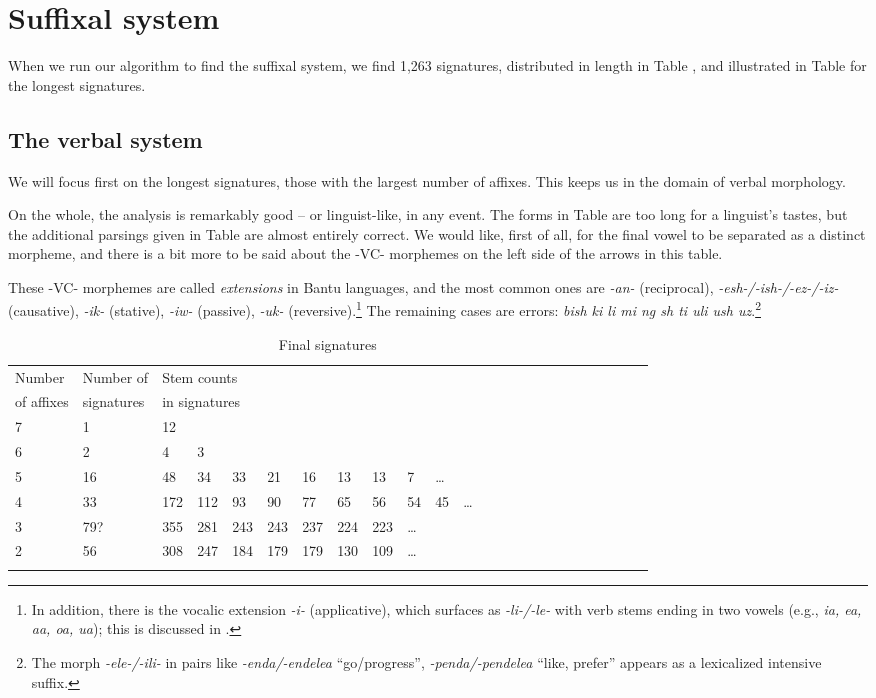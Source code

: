 \documentclass[output=paper,colorlinks,citecolor=brown]{langscibook}
\begin{document}
\section{Suffixal system}

When we run our algorithm to find the suffixal system, we find 1,263 signatures, distributed in length in Table , and illustrated in Table  for the longest signatures.

\subsection{The verbal system}

We will focus first on the longest signatures, those with the largest number of affixes. This keeps us in the domain of verbal morphology.

On the whole, the analysis is remarkably good -- or linguist-like, in any event. The forms in Table  are too long for a linguist's tastes, but the additional parsings given in Table  are almost entirely correct. We would like, first of all, for the final vowel to be separated as a distinct morpheme, and there is a bit more to be said about the -VC- morphemes on the left side of the arrows in this table.

These -VC- morphemes are called \textit{extensions} in Bantu languages, and the most common ones are \textit{-an-} (reciprocal), \textit{-esh-/-ish-/-ez-/-iz-} (causative), \textit{-ik-} (stative), \textit{-iw-} (passive), \textit{-uk-} (reversive).\footnote{In addition, there is the vocalic extension \textit{-i-} (applicative), which surfaces as \textit{-li-/-le-} with verb stems ending in two vowels (e.g., \textit{ia, ea, aa, oa, ua}); this is discussed in \cite[112, 146]{Mpiranya2014}.} The remaining cases are errors: \textit{bish ki li mi ng sh ti uli ush uz}.\footnote{The morph \textit{-ele-/-ili-} in pairs like \textit{-enda/-endelea} ``go/progress'', \textit{-penda/-pendelea} ``like, prefer'' appears as a lexicalized intensive suffix.} 



\begin{table}
\begin{tabular}{llllllllllllllllllllllll} \lsptoprule
Number  &  Number of  & \multicolumn{10}{l}{Stem counts } \\
 of affixes &   signatures & \multicolumn{10}{l}{in signatures} \\ \midrule
7 & 1 & 12  \\
6 & 2 & 4 & 3  \\
5 & 16 & 48 & 34 & 33 & 21 & 16 & 13 & 13 & 7 &    \ldots \\
4 & 33 & 172 & 112 & 93 & 90 & 77 & 65& 56 & 54 & 45& \ldots\\
3 &  79? & 355 & 281 & 243 & 243  & 237 & 224 & 223 &  \ldots\\
2 & 56 & 308 & 247 & 184 & 179 & 179 & 130 & 109 & \ldots \\ \lspbottomrule
\end{tabular}
\caption{Final signatures}
\label{final-sigs-1}
\end{table}
\end{document}
